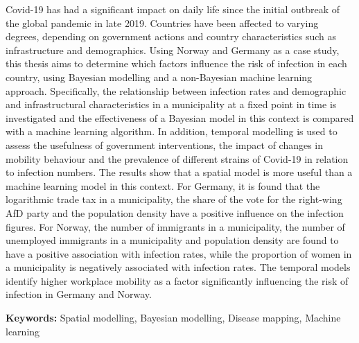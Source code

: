 %
\label{sec:abstract}
Covid-19 has had a significant impact on daily life since the initial outbreak of the global pandemic in late 2019. Countries have been affected to varying degrees, depending on government actions and country characteristics such as infrastructure and demographics. Using Norway and Germany as a case study, this thesis aims to determine which factors influence the risk of infection in each country, using Bayesian modelling and a non-Bayesian machine learning approach. Specifically, the relationship between infection rates and demographic and infrastructural characteristics in a municipality at a fixed point in time is investigated and the effectiveness of a Bayesian model in this context is compared with a machine learning algorithm. In addition, temporal modelling is used to assess the usefulness of government interventions, the impact of changes in mobility behaviour and the prevalence of different strains of Covid-19 in relation to infection numbers. The results show that a spatial model is more useful than a machine learning model in this context. For Germany, it is found that the logarithmic trade tax in a municipality, the share of the vote for the right-wing AfD party and the population density have a positive influence on the infection figures. For Norway, the number of immigrants in a municipality, the number of unemployed immigrants in a municipality and population density are found to have a positive association with infection rates, while the proportion of women in a municipality is negatively associated with infection rates. The temporal models identify higher workplace mobility as a factor significantly influencing the risk of infection in Germany and Norway.

\textbf{Keywords:} Spatial modelling, Bayesian modelling, Disease mapping, Machine learning
\clearpage